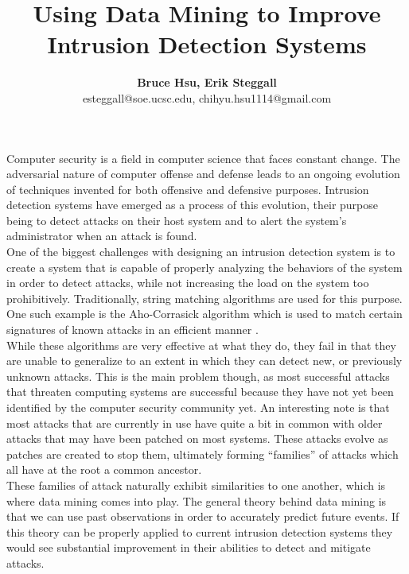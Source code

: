 \documentclass[12pt]{article} %
\title{Using Data Mining to Improve Intrusion Detection Systems}
\author{\textbf{Bruce Hsu, Erik Steggall}\\ esteggall@soe.ucsc.edu, chihyu.hsu1114@gmail.com}
\date{} %
\begin{document}
\maketitle
\thispagestyle{empty}
Computer security is a field in computer science that faces constant change. The adversarial nature of computer offense and defense leads to an ongoing evolution of techniques invented for both offensive and defensive purposes. Intrusion detection systems have emerged as a process of this evolution, their purpose being to detect attacks on their host system and to alert the system's administrator when an attack is found.\\
One of the biggest challenges with designing an intrusion detection system is to create a system that is capable of properly analyzing the behaviors of the system in order to detect attacks, while not increasing the load on the system too prohibitively. Traditionally, string matching algorithms are used for this purpose. One such example is the Aho-Corrasick algorithm which is used to match certain signatures of known attacks in an efficient manner \cite{tuck04}.\\
While these algorithms are very effective at what they do, they fail in that they are unable to generalize to an extent in which they can detect new, or previously unknown attacks. This is the main problem though, as most successful attacks that threaten computing systems are successful because they have not yet been identified by the computer security community yet. An interesting note is that most attacks that are currently in use have quite a bit in common with older attacks that may have been patched on most systems. These attacks evolve as patches are created to stop them, ultimately forming ``families'' of attacks which all have at the root a common ancestor.\\ 
These families of attack naturally exhibit similarities to one another, which is where data mining comes into play. The general theory behind data mining is that we can use past observations in order to accurately predict future events. If this theory can be properly applied to current intrusion detection systems they would see substantial improvement in their abilities to detect and mitigate attacks.\\
\end{document}
